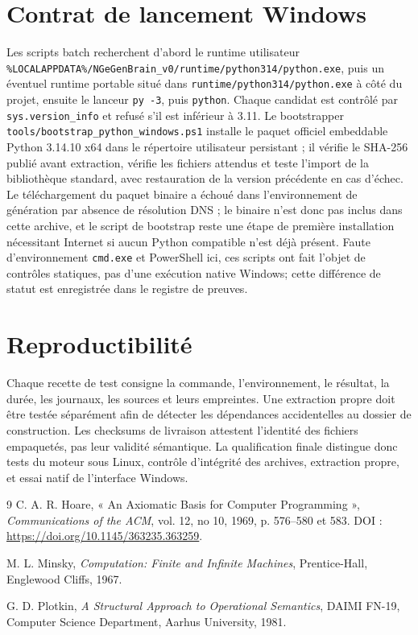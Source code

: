 \documentclass[11pt,a4paper,openany]{book}
\newcommand{\code}[1]{\texttt{#1}}
\theoremstyle{definition}
\theoremstyle{plain}
\theoremstyle{remark}
\begin{document}
\section{Contrat de lancement Windows}
Les scripts batch recherchent d’abord le runtime utilisateur \code{\%LOCALAPPDATA\%/NGeGenBrain\_v0/runtime/python314/python.exe}, puis un éventuel runtime portable situé dans \code{runtime/python314/python.exe} à côté du projet, ensuite le lanceur \code{py -3}, puis \code{python}. Chaque candidat est contrôlé par \code{sys.version\_info} et refusé s’il est inférieur à 3.11. Le bootstrapper \code{tools/bootstrap\_python\_windows.ps1} installe le paquet officiel embeddable Python 3.14.10 x64 dans le répertoire utilisateur persistant ; il vérifie le SHA-256 publié avant extraction, vérifie les fichiers attendus et teste l’import de la bibliothèque standard, avec restauration de la version précédente en cas d’échec. Le téléchargement du paquet binaire a échoué dans l’environnement de génération par absence de résolution DNS ; le binaire n’est donc pas inclus dans cette archive, et le script de bootstrap reste une étape de première installation nécessitant Internet si aucun Python compatible n’est déjà présent. Faute d’environnement \code{cmd.exe} et PowerShell ici, ces scripts ont fait l’objet de contrôles statiques, pas d’une exécution native Windows; cette différence de statut est enregistrée dans le registre de preuves.

\section{Reproductibilité}
Chaque recette de test consigne la commande, l'environnement, le résultat, la durée, les journaux, les sources et leurs empreintes. Une extraction propre doit être testée séparément afin de détecter les dépendances accidentelles au dossier de construction. Les checksums de livraison attestent l'identité des fichiers empaquetés, pas leur validité sémantique. La qualification finale distingue donc tests du moteur sous Linux, contrôle d'intégrité des archives, extraction propre, et essai natif de l'interface Windows.

\backmatter
\begin{thebibliography}{9}
C. A. R. Hoare, « An Axiomatic Basis for Computer Programming », \emph{Communications of the ACM}, vol. 12, no 10, 1969, p. 576--580 et 583. DOI : \url{https://doi.org/10.1145/363235.363259}.

M. L. Minsky, \emph{Computation: Finite and Infinite Machines}, Prentice-Hall, Englewood Cliffs, 1967.

G. D. Plotkin, \emph{A Structural Approach to Operational Semantics}, DAIMI FN-19, Computer Science Department, Aarhus University, 1981.

\end{thebibliography}
\end{document}

